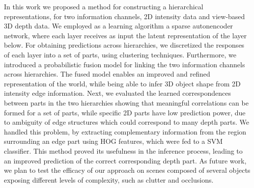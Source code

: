 \documentclass[conference]{IEEEtran}
\begin{document}
In this work we proposed a method for constructing a hierarchical representations, for two information channels, 2D intensity data and view-based 3D depth data. We employed as a learning algorithm a sparse autonencoder network, where each layer receives as input the latent representation of the layer below. For obtaining predictions across hierarchies, we discretized the responses of each layer into a set of parts, using clustering techniques. Furthermore, we introduced a probabilistic fusion model for linking the two information channels across hierarchies. The fused model enables an improved and refined representation of the world, while being able to infer 3D object shape from 2D intensity edge information. Next, we evaluated the learned correspondences between parts in the two hierarchies showing that meaningful correlations can be formed for a set of parts, while specific 2D parts have low prediction power, due to ambiguity of edge structures which could correspond to many depth parts. We handled this problem, by extracting complementary information from the region surrounding an edge part using HOG features, which were fed to a SVM classifier. This method proved its usefulness in the inference process, leading to an improved prediction of the correct corresponding depth part. As future work, we plan to test the efficacy of our approach on scenes composed of several objects exposing different levels of complexity, such as clutter and occlusions.




%
%
\end{document}
